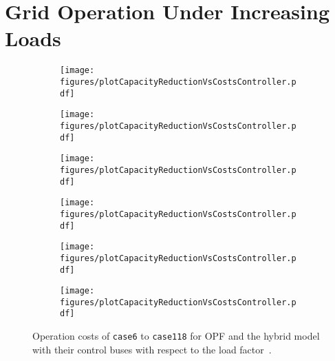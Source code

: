 \documentclass{article}[11pt,a4paper]
\begin{document}
\section{Grid Operation Under Increasing Loads}
\label{app:grid-control-when-approaching-capacity-limits}
\begin{figure}[H]
\vspace{-0.4cm}
  \begin{subfigure}[t]{.45\textwidth}
  	\centering
    	\texttt{[image: figures/plotCapacityReductionVsCostsController.pdf]}
\label{fig:plot-capacity-cost-controller-case6}
\end{subfigure}
\hfill
\begin{subfigure}[t]{.45\textwidth}
  	\centering
    	\texttt{[image: figures/plotCapacityReductionVsCostsController.pdf]}
\label{fig:plot-capacity-cost-controller-case9}
\end{subfigure}

\vspace{0.5cm}
\begin{subfigure}[t]{.45\textwidth}
  	\centering
    	\texttt{[image: figures/plotCapacityReductionVsCostsController.pdf]}
\label{fig:plot-capacity-cost-controller-case14}
\end{subfigure}
\hfill
\begin{subfigure}[t]{.45\textwidth}
  	\centering
    	\texttt{[image: figures/plotCapacityReductionVsCostsController.pdf]}
\label{fig:plot-capacity-cost-controller-case30}
\end{subfigure}

\vspace{0.5cm}
\begin{subfigure}[t]{.45\textwidth}
  	\centering
    	\texttt{[image: figures/plotCapacityReductionVsCostsController.pdf]}
\label{fig:plot-capacity-cost-controller-case39}
\end{subfigure}
\hfill
\begin{subfigure}[t]{.45\textwidth}
  	\centering
    	\texttt{[image: figures/plotCapacityReductionVsCostsController.pdf]}
	\label{fig:plot-capacity-cost-controller-case118}
\end{subfigure}
\vspace{0cm}
	\caption{Operation costs of \texttt{case6} to \texttt{case118} for OPF and the
          hybrid model with their control buses with respect to
          the load factor~.}
\end{figure}
\end{document}
